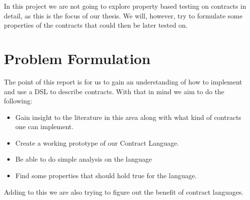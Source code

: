 \documentclass{ituthesis}
\begin{document}
In this project we are not going to explore property based testing on contracts in detail, as this is the focus of our thesis. We will, however, try to formulate some properties of the contracts that could then be later tested on.

\section{Problem Formulation}
The point of this report is for us to gain an understanding of how to implement and use a DSL to describe contracts. With that in mind we aim to do the following:

\begin{itemize}
    \item Gain insight to the literature in this area along with what kind of contracts one can implement.
    \item Create a working prototype of our Contract Language.
    \item Be able to do simple analysis on the language
    \item Find some properties that should hold true for the language.
\end{itemize}

Adding to this we are also trying to figure out the benefit of contract languages.

\end{document}
